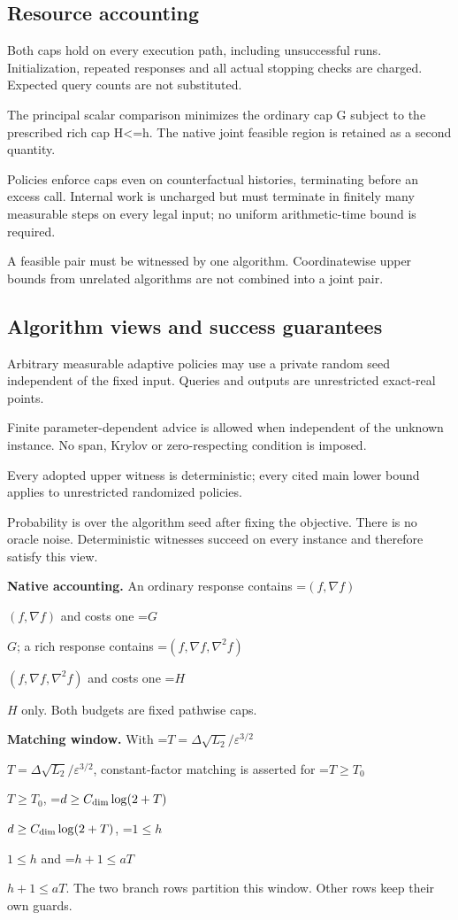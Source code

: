 \documentclass[10pt,a4paper]{article}
\newcommand{\AtlasMath}[1]{\par\begingroup\centering\setbox0=\hbox{$\displaystyle #1$}\ifdim\wd0>1.4\linewidth\typeout{ATLAS WIDE FORMULA: \the\wd0}\fi\ifdim\wd0>\linewidth\resizebox{\linewidth}{!}{\box0}\else\box0\fi\par\endgroup}
\newcommand{\AtlasInlineMath}[1]{\begingroup\setbox0=\hbox{$#1$}\ifdim\wd0>.4\linewidth\endgroup\AtlasMath{#1}\else\endgroup$#1$\fi}
\begin{document}
\subsection{Resource accounting}
Both caps hold on every execution path, including unsuccessful runs. Initialization, repeated responses and all actual stopping checks are charged. Expected query counts are not substituted.

The principal scalar comparison minimizes the ordinary cap G subject to the prescribed rich cap H<=h. The native joint feasible region is retained as a second quantity.

Policies enforce caps even on counterfactual histories, terminating before an excess call. Internal work is uncharged but must terminate in finitely many measurable steps on every legal input; no uniform arithmetic-time bound is required.

A feasible pair must be witnessed by one algorithm. Coordinatewise upper bounds from unrelated algorithms are not combined into a joint pair.

\subsection{Algorithm views and success guarantees}
Arbitrary measurable adaptive policies may use a private random seed independent of the fixed input. Queries and outputs are unrestricted exact-real points.

Finite parameter-dependent advice is allowed when independent of the unknown instance. No span, Krylov or zero-respecting condition is imposed.

Every adopted upper witness is deterministic; every cited main lower bound applies to unrestricted randomized policies.

Probability is over the algorithm seed after fixing the objective. There is no oracle noise. Deterministic witnesses succeed on every instance and therefore satisfy this view.

\textbf{Native accounting.} An ordinary response contains \AtlasInlineMath{(f,\nabla f)} and costs one \AtlasInlineMath{G}; a rich response contains \AtlasInlineMath{(f,\nabla f,\nabla^2f)} and costs one \AtlasInlineMath{H} only. Both budgets are fixed pathwise caps.

\textbf{Matching window.} With \AtlasInlineMath{T=\Delta\sqrt{L_2}/\varepsilon^{3/2}}, constant-factor matching is asserted for \AtlasInlineMath{T\ge T_0}, \AtlasInlineMath{d\ge C_{\rm dim}\log(2+T)}, \AtlasInlineMath{1\le h} and \AtlasInlineMath{h+1\le aT}. The two branch rows partition this window. Other rows keep their own guards.
\end{document}
